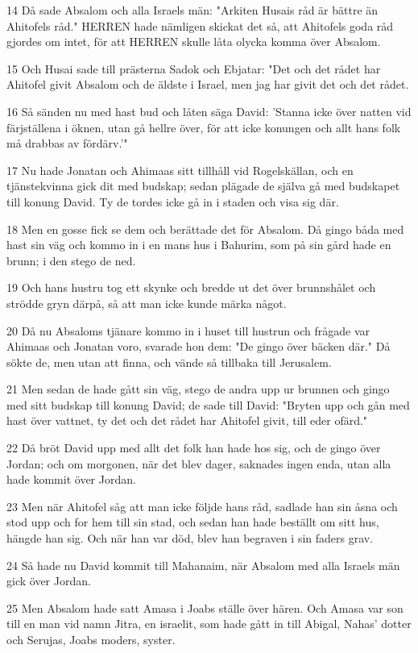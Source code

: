 \par 14 Då sade Absalom och alla Israels män: "Arkiten Husais råd är bättre än Ahitofels råd." HERREN hade nämligen skickat det så, att Ahitofels goda råd gjordes om intet, för att HERREN skulle låta olycka komma över Absalom.
\par 15 Och Husai sade till prästerna Sadok och Ebjatar: "Det och det rådet har Ahitofel givit Absalom och de äldste i Israel, men jag har givit det och det rådet.
\par 16 Så sänden nu med hast bud och låten säga David: 'Stanna icke över natten vid färjställena i öknen, utan gå hellre över, för att icke konungen och allt hans folk må drabbas av fördärv.'"
\par 17 Nu hade Jonatan och Ahimaas sitt tillhåll vid Rogelskällan, och en tjänstekvinna gick dit med budskap; sedan plägade de själva gå med budskapet till konung David. Ty de tordes icke gå in i staden och visa sig där.
\par 18 Men en gosse fick se dem och berättade det för Absalom. Då gingo båda med hast sin väg och kommo in i en mans hus i Bahurim, som på sin gård hade en brunn; i den stego de ned.
\par 19 Och hans hustru tog ett skynke och bredde ut det över brunnshålet och strödde gryn därpå, så att man icke kunde märka något.
\par 20 Då nu Absaloms tjänare kommo in i huset till hustrun och frågade var Ahimaas och Jonatan voro, svarade hon dem: "De gingo över bäcken där." Då sökte de, men utan att finna, och vände så tillbaka till Jerusalem.
\par 21 Men sedan de hade gått sin väg, stego de andra upp ur brunnen och gingo med sitt budskap till konung David; de sade till David: "Bryten upp och gån med hast över vattnet, ty det och det rådet har Ahitofel givit, till eder ofärd."
\par 22 Då bröt David upp med allt det folk han hade hos sig, och de gingo över Jordan; och om morgonen, när det blev dager, saknades ingen enda, utan alla hade kommit över Jordan.
\par 23 Men när Ahitofel såg att man icke följde hans råd, sadlade han sin åsna och stod upp och for hem till sin stad, och sedan han hade beställt om sitt hus, hängde han sig. Och när han var död, blev han begraven i sin faders grav.
\par 24 Så hade nu David kommit till Mahanaim, när Absalom med alla Israels män gick över Jordan.
\par 25 Men Absalom hade satt Amasa i Joabs ställe över hären. Och Amasa var son till en man vid namn Jitra, en israelit, som hade gått in till Abigal, Nahas' dotter och Serujas, Joabs moders, syster.
